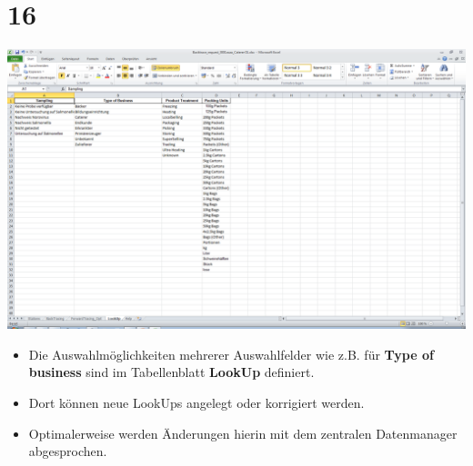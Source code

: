\documentclass{beamer}
\begin{document}
\section{16}
\begin{frame}
	\begin{center}
  		\includegraphics[height=0.6\textheight]{16.png}
	\end{center}
	\begin{itemize}
		\item Die Auswahlmöglichkeiten mehrerer Auswahlfelder wie z.B. für \textbf{Type of business} sind im Tabellenblatt \textbf{LookUp} definiert.
		\item Dort können neue LookUps angelegt oder korrigiert werden.
		\item Optimalerweise werden Änderungen hierin mit dem zentralen Datenmanager abgesprochen.
	\end{itemize}
\end{frame}
\end{document}
